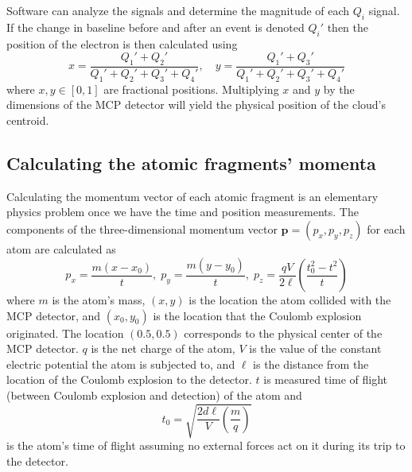 Software can analyze the signals and determine the magnitude of each $Q_i$ signal. If the change in baseline before and after an event is denoted $Q_i'$ then the position of the electron is then calculated using
\begin{equation}\label{eq:xy}
x = \frac{Q_1' + Q_2'}
         {Q_1' + Q_2' + Q_3' + Q_4'} ,\quad
y = \frac{Q_1' + Q_3'}
         {Q_1' + Q_2' + Q_3' + Q_4'}
\end{equation}
where $x,y \in [0,1]$ are fractional positions. Multiplying $x$ and $y$ by the dimensions of the MCP detector will yield the physical position of the cloud's centroid.

\subsection{Calculating the atomic fragments' momenta}
Calculating the momentum vector of each atomic fragment is an elementary physics problem once we have the time and position measurements. The components of the three-dimensional momentum vector $\mathbf{p} = (p_x,p_y,p_z)$ for each atom are calculated as
\begin{equation}\label{eq:CEImomenta}
p_x = \frac{m(x-x_0)}{t} ,\;
p_y = \frac{m(y-y_0)}{t} ,\;
p_z = \frac{qV}{2\ell} \left( \frac{t_0^2 - t^2}{t} \right)
\end{equation}
where $m$ is the atom's mass, $(x,y)$ is the location the atom collided with the MCP detector, and $(x_0,y_0)$ is the location that the Coulomb explosion originated. The location $(0.5,0.5)$ corresponds to the physical center of the MCP detector. $q$ is the net charge of the atom, $V$ is the value of the constant electric potential the atom is subjected to, and $\ell$ is the distance from the location of the Coulomb explosion to the detector. $t$ is measured time of flight (between Coulomb explosion and detection) of the atom and 
\begin{equation}
t_0 = \sqrt{\frac{2d\ell}{V} \left( \frac{m}{q} \right)}
\end{equation}
is the atom's time of flight assuming no external forces act on it during its trip to the detector.

